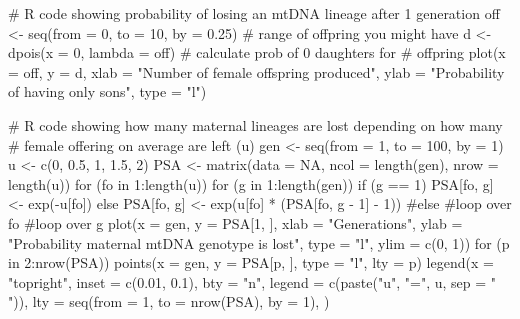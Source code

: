 \documentclass{report}\usepackage[]{graphicx}\usepackage[]{color}
\begin{document}
\begin{Schunk}
\begin{Sinput}
# R code showing probability of losing an mtDNA lineage after 1 generation
off <- seq(from = 0, to = 10, by = 0.25)  # range of offpring you might have
d <- dpois(x = 0, lambda = off)  # calculate prob of 0 daughters for # offpring
plot(x = off, y = d, xlab = "Number of female offspring produced", ylab = "Probability of having only sons", 
    type = "l")
\end{Sinput}
\begin{Sinput}
# R code showing how many maternal lineages are lost depending on how many
# female offering on average are left (u)
gen <- seq(from = 1, to = 100, by = 1)
u <- c(0, 0.5, 1, 1.5, 2)
PSA <- matrix(data = NA, ncol = length(gen), nrow = length(u))
for (fo in 1:length(u)) {
    for (g in 1:length(gen)) {
        if (g == 1) {
            PSA[fo, g] <- exp(-u[fo])
        } else {
            PSA[fo, g] <- exp(u[fo] * (PSA[fo, g - 1] - 1))
        }  #else
    }  #loop over fo
}  #loop over g
plot(x = gen, y = PSA[1, ], xlab = "Generations", ylab = "Probability maternal mtDNA genotype is lost", 
    type = "l", ylim = c(0, 1))
for (p in 2:nrow(PSA)) {
    points(x = gen, y = PSA[p, ], type = "l", lty = p)
}
legend(x = "topright", inset = c(0.01, 0.1), bty = "n", legend = c(paste("u", 
    "=", u, sep = " ")), lty = seq(from = 1, to = nrow(PSA), by = 1), )
\end{Sinput}
\end{Schunk}
\end{document}
